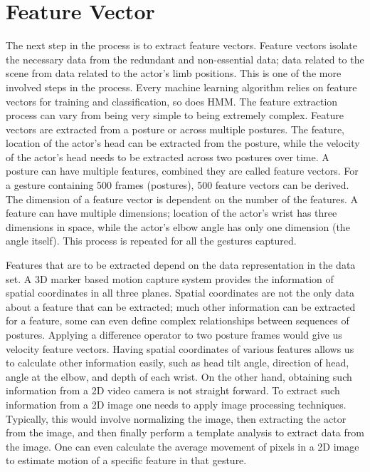 \documentclass[]{report}   %
\begin{document}
\section{Feature Vector}
The next step in the process is to extract feature vectors. Feature vectors isolate the necessary data from the redundant and non-essential data; data related to the scene from data related to the actor's limb positions. This is one of the more involved steps in the process. Every machine learning algorithm relies on feature vectors for training and classification, so does HMM. The feature extraction process can vary from being very simple to being extremely complex. Feature vectors are extracted from a posture or across multiple postures. The feature, location of the actor's head can be extracted from the posture, while the velocity of the actor's head needs to be extracted across two postures over time. A posture can have multiple features, combined they are called feature vectors. For a gesture containing 500 frames (postures), 500 feature vectors can be derived. The dimension of a feature vector is dependent on the number of the features. A feature can have multiple dimensions; location of the actor's wrist has three dimensions in space, while the actor's elbow angle has only one dimension (the angle itself).  This process is repeated for all the gestures captured.

Features that are to be extracted depend on the data representation in the data set. A 3D marker based motion capture system provides the information of spatial coordinates in all three planes. Spatial coordinates are not the only data about a feature that can be extracted; much other information can be extracted for a feature, some can even define complex relationships between sequences of postures. Applying a difference operator to two posture frames would give us velocity feature vectors. Having spatial coordinates of various features allows us to calculate other information easily, such as head tilt angle, direction of head, angle at the elbow, and depth of each wrist. On the other hand, obtaining such information from a 2D video camera is not straight forward. To extract such information from a 2D image one needs to apply image processing techniques\cite{springerlink:10.1007/978-3-642-04229-4_4}. Typically, this would involve normalizing the image, then extracting the actor from the image, and then finally perform a template analysis to extract data from the image. One can even calculate the average movement of pixels in a 2D image to estimate motion of a specific feature in that gesture\cite{Rigoll98highperformance}.
\end{document}
